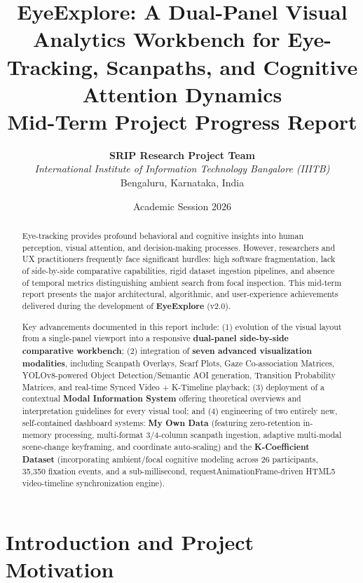 \documentclass[11pt,a4paper]{article}
\title{
    \vspace{-1.5cm}
    \textbf{\Huge EyeExplore: A Dual-Panel Visual Analytics Workbench for Eye-Tracking, Scanpaths, and Cognitive Attention Dynamics}\\[0.4cm]
    \Large \textbf{Mid-Term Project Progress Report}
}
\author{
    \textbf{SRIP Research Project Team}\\[0.15cm]
    \textit{International Institute of Information Technology Bangalore (IIITB)}\\
    \small Bengaluru, Karnataka, India
}
\date{Academic Session 2026}
\begin{document}
\maketitle
\thispagestyle{empty}

\begin{abstract}
Eye-tracking provides profound behavioral and cognitive insights into human perception, visual attention, and decision-making processes. However, researchers and UX practitioners frequently face significant hurdles: high software fragmentation, lack of side-by-side comparative capabilities, rigid dataset ingestion pipelines, and absence of temporal metrics distinguishing ambient search from focal inspection. This mid-term report presents the major architectural, algorithmic, and user-experience achievements delivered during the development of \textbf{EyeExplore} (v2.0). 

Key advancements documented in this report include: (1) evolution of the visual layout from a single-panel viewport into a responsive \textbf{dual-panel side-by-side comparative workbench}; (2) integration of \textbf{seven advanced visualization modalities}, including Scanpath Overlays, Scarf Plots, Gaze Co-association Matrices, YOLOv8-powered Object Detection/Semantic AOI generation, Transition Probability Matrices, and real-time Synced Video + K-Timeline playback; (3) deployment of a contextual \textbf{Modal Information System} offering theoretical overviews and interpretation guidelines for every visual tool; and (4) engineering of two entirely new, self-contained dashboard systems: \textbf{My Own Data} (featuring zero-retention in-memory processing, multi-format 3/4-column scanpath ingestion, adaptive multi-modal scene-change keyframing, and coordinate auto-scaling) and the \textbf{K-Coefficient Dataset} (incorporating ambient/focal cognitive modeling across 26 participants, 35,350 fixation events, and a sub-millisecond, requestAnimationFrame-driven HTML5 video-timeline synchronization engine).
\end{abstract}

\vspace{0.3cm}
\tableofcontents
\newpage

\section{Introduction and Project Motivation}
\label{sec:introduction}
\end{document}
